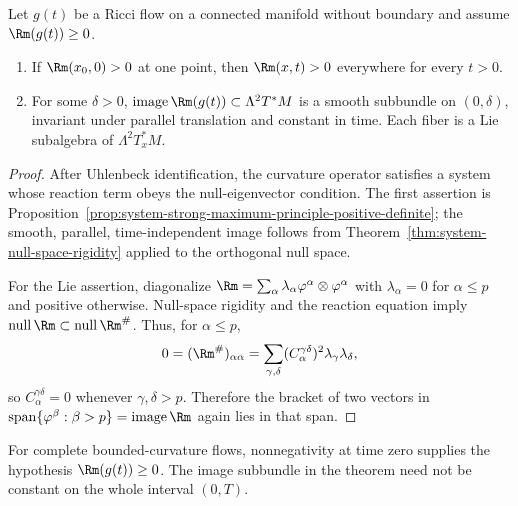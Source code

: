 \begin{theorem}
\label{thm:curvature-operator-strong-maximum-principle}
Let $g(t)$ be a Ricci flow on a connected manifold without boundary and assume
$\Rm(g(t))\geq0$.
\begin{enumerate}
\item If $\Rm(x_0,0)>0$ at one point, then $\Rm(x,t)>0$ everywhere for every
$t>0$.
\item For some $\delta>0$, $\operatorname{image}\Rm(g(t))\subset
\Lambda^2T^*M$ is a smooth subbundle on $(0,\delta)$, invariant under parallel
translation and constant in time.  Each fiber is a Lie subalgebra of
$\Lambda^2T_x^*M$.
\end{enumerate}
\end{theorem}

\begin{proof}
\sketch
{}
After Uhlenbeck identification, the curvature operator satisfies a system
whose reaction term obeys the null-eigenvector condition.  The first assertion
is Proposition~\ref{prop:system-strong-maximum-principle-positive-definite};
the smooth, parallel, time-independent image follows from
Theorem~\ref{thm:system-null-space-rigidity} applied to the orthogonal null
space.

For the Lie assertion, diagonalize
$\Rm=\sum_\alpha\lambda_\alpha\varphi^\alpha\otimes\varphi^\alpha$ with
$\lambda_\alpha=0$ for $\alpha\leq p$ and positive otherwise.  Null-space
rigidity and the reaction equation imply
$\operatorname{null}\Rm\subset\operatorname{null}\Rm^\#$.  Thus, for
$\alpha\leq p$,
\[
0=(\Rm^\#)_{\alpha\alpha}
=\sum_{\gamma,\delta}(C_\alpha^{\gamma\delta})^2
\lambda_\gamma\lambda_\delta,
\]
so $C_\alpha^{\gamma\delta}=0$ whenever $\gamma,\delta>p$.  Therefore the
bracket of two vectors in
$\operatorname{span}\{\varphi^\beta:\beta>p\}=\operatorname{image}\Rm$
again lies in that span.
\end{proof}

\begin{remark}
\label{rem:curvature-operator-image-time-interval}
For complete bounded-curvature flows, nonnegativity at time zero supplies the
hypothesis $\Rm(g(t))\geq0$.  The image subbundle in the theorem need not be
constant on the whole interval $(0,T)$.
\end{remark}

